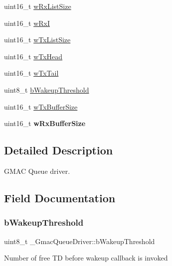 \begin{DoxyCompactItemize}
uint16\+\_\+t \mbox{\hyperlink{struct__GmacQueueDriver_af14d5f9d02f8a04bd4d890a6298b0f25}{w\+Rx\+List\+Size}}
\item 
uint16\+\_\+t \mbox{\hyperlink{struct__GmacQueueDriver_a6dda1856126e9e770cab7fa81512aa3f}{w\+RxI}}
\item 
uint16\+\_\+t \mbox{\hyperlink{struct__GmacQueueDriver_a6696b1374f7d007f4bee968a99e30ec1}{w\+Tx\+List\+Size}}
\item 
uint16\+\_\+t \mbox{\hyperlink{struct__GmacQueueDriver_af173f2d771a33ee45d39e23bd57cae36}{w\+Tx\+Head}}
\item 
uint16\+\_\+t \mbox{\hyperlink{struct__GmacQueueDriver_a3765e4cabe6ed11515b5303b5ae20f4c}{w\+Tx\+Tail}}
\item 
uint8\+\_\+t \mbox{\hyperlink{struct__GmacQueueDriver_afb25ef88613ffcb919591f644f07cc7c}{b\+Wakeup\+Threshold}}
\item 
uint16\+\_\+t \mbox{\hyperlink{struct__GmacQueueDriver_a6c0a2a2f5c455cd19f2fa59012599bac}{w\+Tx\+Buffer\+Size}}
\item 
\mbox{\label{struct__GmacQueueDriver_ac30da75e911ed6bf41baee235a786177}} 
uint16\+\_\+t {\bfseries w\+Rx\+Buffer\+Size}
\end{DoxyCompactItemize}


\subsection{Detailed Description}
G\+M\+AC Queue driver. 

\subsection{Field Documentation}
\mbox{\label{struct__GmacQueueDriver_afb25ef88613ffcb919591f644f07cc7c}} 
\subsubsection{\texorpdfstring{bWakeupThreshold}{bWakeupThreshold}}
{\footnotesize\ttfamily uint8\+\_\+t \+\_\+\+Gmac\+Queue\+Driver\+::b\+Wakeup\+Threshold}

Number of free TD before wakeup callback is invoked \mbox{\label{struct__GmacQueueDriver_a30d05050728f18ee6146aec446281619}} 
